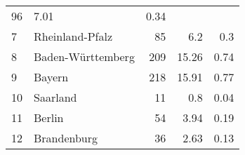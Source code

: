 \begin{longtable}{lXrrr}
       \num{96} &
       \num[round-mode=places,round-precision=2]{7.01} &
         \num[round-mode=places,round-precision=2]{0.34} \\

     7 &
     \multicolumn{1}{X}{ Rheinland-Pfalz   } &


       \num{85} &
       \num[round-mode=places,round-precision=2]{6.2} &
         \num[round-mode=places,round-precision=2]{0.3} \\

     8 &
     \multicolumn{1}{X}{ Baden-Württemberg   } &


       \num{209} &
       \num[round-mode=places,round-precision=2]{15.26} &
         \num[round-mode=places,round-precision=2]{0.74} \\

     9 &
     \multicolumn{1}{X}{ Bayern   } &


       \num{218} &
       \num[round-mode=places,round-precision=2]{15.91} &
         \num[round-mode=places,round-precision=2]{0.77} \\

     10 &
     \multicolumn{1}{X}{ Saarland   } &


       \num{11} &
       \num[round-mode=places,round-precision=2]{0.8} &
         \num[round-mode=places,round-precision=2]{0.04} \\

     11 &
     \multicolumn{1}{X}{ Berlin   } &


       \num{54} &
       \num[round-mode=places,round-precision=2]{3.94} &
         \num[round-mode=places,round-precision=2]{0.19} \\

     12 &
     \multicolumn{1}{X}{ Brandenburg   } &


       \num{36} &
       \num[round-mode=places,round-precision=2]{2.63} &
         \num[round-mode=places,round-precision=2]{0.13} \\


\end{longtable}
